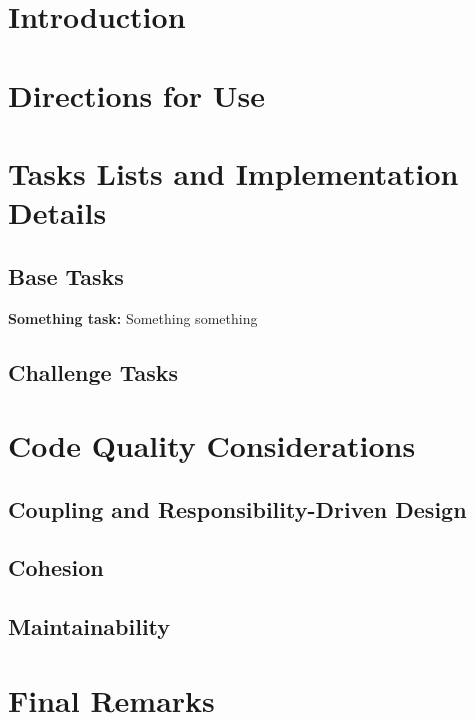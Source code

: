 \documentclass[10pt, a4paper]{scrartcl}
\begin{document}
    \begin{multicols}{2}


        \section{Introduction}
        

        \section{Directions for Use}

        \section{Tasks Lists and Implementation Details}

        \subsection{Base Tasks}

        \noindent \textbf{Something task:}
        Something something

        \subsection{Challenge Tasks}

       
        \section{Code Quality Considerations}

        \subsection{Coupling and Responsibility-Driven Design}
      
        \subsection{Cohesion}
        
        \subsection{Maintainability}
        
        \section{Final Remarks}
        

    \end{multicols}
\end{document}
